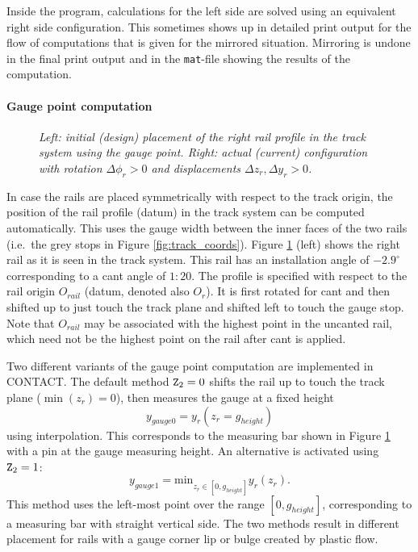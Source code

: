 \documentclass[12pt]{report}
\begin{document}
Inside the program, calculations for the left side are solved using
an equivalent right side configuration. This sometimes shows up in detailed
print output for the flow of computations that is given for the mirrored
situation. Mirroring is undone in the final print output and in the
{\tt mat}-file showing the results of the computation.

\paragraph{Gauge point computation}

\begin{figure}[bt]
\centering
{}
\caption{\em Left: initial (design) placement of the right rail profile in
        the track system using the gauge point. Right: actual
        (current) configuration with rotation $\Delta\phi_{r}>0$ and
        displacements $\Delta z_{r}, \Delta y_{r}>0$.}
\label{fig:rail_coords}
\end{figure}

In case the rails are placed symmetrically with respect to the track
origin, the position of the rail profile (datum) in the track system can be
computed automatically. This uses the gauge width between the inner faces
of the two rails (i.e.\ the grey stops in Figure \ref{fig:track_coords}).
Figure \ref{fig:rail_coords} (left) shows the right rail as it is seen in
the track system. This rail has an installation angle of $-2.9^\circ$
corresponding to a cant angle of $1:20$. The profile is specified
with respect to the rail origin $O_{rail}$ (datum, denoted also $O_{r}$).
It is first rotated for cant and then shifted up to just touch the track
plane and shifted left to touch the gauge stop. Note that $O_{rail}$ may be
associated with the highest point in the uncanted rail, which need not be
the highest point on the rail after cant is applied.

\label{sec:ztrck2}Two different variants of the gauge point computation are
implemented in CONTACT. The default method ${\tt Z}_2=0$ shifts the rail up
to touch the track plane ($\min(z_r)=0$), then measures the gauge at a fixed
height
\begin{equation}
        y_{gauge0}=y_r(z_r=g_{height}) 
\end{equation}
using interpolation. This corresponds to the measuring bar shown in Figure
\ref{fig:rail_coords} with a pin at the gauge measuring height. An
alternative is activated using ${\tt Z}_2=1$:
\begin{equation}
        y_{gauge1} = \mathrm{min}_{z_r\in[0,g_{height}]} y_r(z_r) .
\end{equation}
This method uses the left-most point over the range $[0,g_{height}]$,
corresponding to a measuring bar with straight vertical side.
The two methods result in different placement for rails with a gauge corner
lip or bulge created by plastic flow. 
\end{document}
